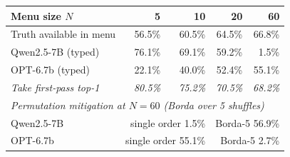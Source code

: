 \begin{tabular}{lrrrr}
\toprule
Menu size $N$ & 5 & 10 & 20 & 60 \\
\midrule
Truth available in menu & 56.5\% & 60.5\% & 64.5\% & 66.8\% \\
\midrule
Qwen2.5-7B (typed) & 76.1\% & 69.1\% & 59.2\% & 1.5\% \\
OPT-6.7b (typed) & 22.1\% & 40.0\% & 52.4\% & 55.1\% \\
\emph{Take first-pass top-1} & \emph{80.5\%} & \emph{75.2\%} & \emph{70.5\%} & \emph{68.2\%} \\
\midrule
\multicolumn{5}{l}{\emph{Permutation mitigation at $N=60$ (Borda over 5 shuffles)}} \\
\quad Qwen2.5-7B & \multicolumn{2}{r}{single order 1.5\%} & \multicolumn{2}{r}{Borda-5 56.9\%} \\
\quad OPT-6.7b & \multicolumn{2}{r}{single order 55.1\%} & \multicolumn{2}{r}{Borda-5 2.7\%} \\
\bottomrule
\end{tabular}
